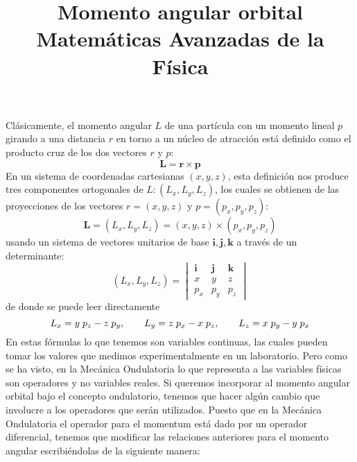 
\usepackage{mathrsfs}
\usepackage{standalone}
\usepackage{tikz}
\usetikzlibrary{shapes}
\usepackage{bigints}
\newtheorem{problema}{{\it Problema}}
\title{Momento angular orbital \\ {\large Matemáticas Avanzadas de la Física}}
\date{ }

\renewcommand\labelenumii{\theenumi.{\arabic{enumii}}}
\maketitle
\fontsize{14}{14}\selectfont
Clásicamente, el momento angular $L$ de una partícula con un momento lineal $p$ girando a una distancia $r$ en torno a un núcleo de atracción está definido como el producto cruz de los dos vectores $r$ y $p$:
\[ \mathbf{L} = \mathbf{r} \times \mathbf{p}\]
En un sistema de coordenadas cartesianas $(x, y, z)$, esta definición nos produce tres componentes ortogonales de $L: (L_{x}, L_{y}, L_{z})$, los cuales se obtienen de las proyecciones de los vectores $r = (x, y, z)$ y $p = (p_{x}, p_{y}, p_{z})$:
\[ \mathbf{L} = (L_{x}, L_{y}, L_{z}) = (x, y, z) \times (p_{x}, p_{y}, p_{z}) \]
usando un sistema de vectores unitarios de base ${\mathbf{i}, \mathbf{j},\mathbf{k}}$ a través de un determinante:
\[ (L_{x}, L_{y}, L_{z}) = \begin{vmatrix}
\mathbf{i} & \mathbf{j} & \mathbf{k} \\
x & y & z \\
p_{x} & p_{y} & p_{z}
\end{vmatrix} \]
de donde se puede leer directamente
\[ L_{x} = y \; p_{z} - z \; p_{y}, \hspace{0.7cm} L_{y} = z \; p_{x} - x \; p_{z}, \hspace{0.7cm} L_{z} = x \; p_{y} - y \; p_{x} \]
En estas fórmulas lo que tenemos son variables continuas, las cuales pueden tomar los valores que medimos experimentalmente en un laboratorio. Pero como se ha visto, en la Mecánica Ondulatoria lo que representa a las variables físicas son operadores y no variables reales. Si queremos incorporar al momento angular orbital bajo el concepto ondulatorio, tenemos que hacer algún cambio que involucre a los operadores que serán utilizados. Puesto que en la Mecánica Ondulatoria el operador para el momentum está dado por un operador diferencial, tenemos que modificar las relaciones anteriores para el momento angular escribiéndolas de la siguiente manera:
